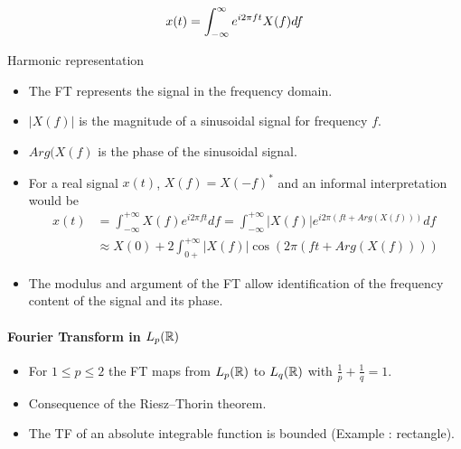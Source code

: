     $$
    x(t)= \int_{-\infty}^\infty e^{ i 2 \pi f t} X(f) d f
  $$

  \begin{block}{Harmonic representation}
    \begin{itemize}
    \item The FT represents the signal in the frequency domain.
    \item $|X(f)| $ is the magnitude of a sinusoidal signal for frequency $f$.
\item $Arg(X(f)$ is the phase of the sinusoidal signal.
    \item For a real signal $x(t)$, $X(f)=X(-f)^*$ and an informal interpretation would be
      \begin{align}
        x(t) &= \int_{-\infty}^{+\infty} X(f) e^{i2\pi f t} df= \int_{-\infty}^{+\infty} |X(f)| e^{i2\pi (f t+Arg(X(f)))} df\\
        &\approx X(0)+2
        \int_{0+}^{+\infty} |X(f)| \cos(2\pi (f t+Arg(X(f))) )\label{eq:1}
      \end{align}
    \item The modulus and argument of the FT allow identification of the frequency content of the signal and its phase.
    \end{itemize}
  \end{block}


  \paragraph{Fourier Transform in $L_p(\mathbb{R})$}



  \begin{itemize}
    \item For $1 \leq p \leq 2 $ the FT maps from $L_p(\mathbb{R})$ to
    $L_q(\mathbb{R})$ with $\frac{1}{p}+\frac{1}{q}=1$.
    \item Consequence of the Riesz–Thorin theorem.
      \item The TF of an absolute integrable function is bounded (Example : rectangle).
  \end{itemize} \vspace{-3mm}
  
